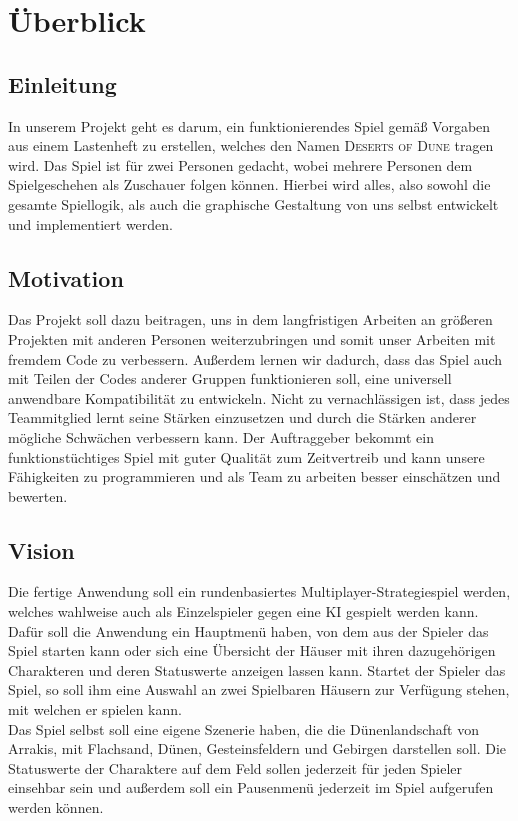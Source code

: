 \documentclass[12pt]{article}
\newcounter{fa}
\begin{document}
\tableofcontents
\thispagestyle{empty}

\newpage

\pagestyle{fancy}

\fancyhead[R]{\thepage}
\fancyhead[L]{\leftmark}
\fancyfoot{}


\section{Überblick}

\subsection{Einleitung}

In unserem Projekt geht es darum, ein funktionierendes Spiel gemäß Vorgaben aus einem Lastenheft zu erstellen, welches den Namen \textsc{Deserts of Dune} tragen wird. Das Spiel ist für zwei Personen gedacht, wobei mehrere Personen dem Spielgeschehen als Zuschauer folgen können. Hierbei wird alles, also sowohl die gesamte Spiellogik, als auch die graphische Gestaltung von uns selbst entwickelt und implementiert werden.

\subsection{Motivation}

Das Projekt soll dazu beitragen, uns in dem langfristigen Arbeiten an größeren Projekten mit anderen Personen weiterzubringen und somit unser Arbeiten mit fremdem Code zu verbessern. Außerdem lernen wir dadurch, dass das Spiel auch mit Teilen der Codes anderer Gruppen funktionieren soll, eine universell anwendbare Kompatibilität zu entwickeln. Nicht zu vernachlässigen ist, dass jedes Teammitglied lernt seine Stärken einzusetzen und durch die Stärken anderer mögliche Schwächen verbessern kann.
Der Auftraggeber bekommt ein funktionstüchtiges Spiel mit guter Qualität zum Zeitvertreib und kann unsere Fähigkeiten zu programmieren und als Team zu arbeiten besser einschätzen und bewerten.

\subsection{Vision}
Die fertige Anwendung soll ein rundenbasiertes Multiplayer-Strategiespiel werden, welches wahlweise auch als Einzelspieler gegen eine KI gespielt werden kann. Dafür soll die Anwendung ein Hauptmenü haben, von dem aus der Spieler das Spiel starten kann oder sich eine Übersicht der Häuser mit ihren dazugehörigen Charakteren und deren Statuswerte anzeigen lassen kann. 
Startet der Spieler das Spiel, so soll ihm eine Auswahl an zwei Spielbaren Häusern zur Verfügung stehen, mit welchen er spielen kann. \\
Das Spiel selbst soll eine eigene Szenerie haben, die die Dünenlandschaft von Arrakis, mit Flachsand, Dünen, Gesteinsfeldern und Gebirgen darstellen soll. Die Statuswerte der Charaktere auf dem Feld sollen jederzeit für jeden Spieler einsehbar sein und außerdem soll ein Pausenmenü jederzeit im Spiel aufgerufen werden können.
\end{document}

